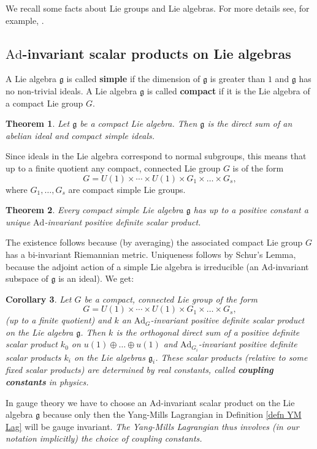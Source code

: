 \documentclass[12pt]{amsart}
\newtheorem{thm}{Theorem}[section]
\newtheorem{cor}[thm]{Corollary}
\theoremstyle{definition}
\theoremstyle{remark}
\numberwithin{equation}{section}
\begin{document}
We recall some facts about Lie groups and Lie algebras. For more details see, for example, \cite{Ziller}.

\subsection{$\mathrm{Ad}$-invariant scalar products on Lie algebras}

A Lie algebra $\mathfrak{g}$ is called {\bf simple} if the dimension of $\mathfrak{g}$ is greater than $1$ and $\mathfrak{g}$ has no non-trivial ideals. A Lie algebra $\mathfrak{g}$ is called {\bf compact} if it is the Lie algebra of a compact Lie group $G$.

\begin{thm} Let $\mathfrak{g}$ be a compact Lie algebra. Then $\mathfrak{g}$ is the direct sum of an abelian ideal and compact simple ideals.
\end{thm}
Since ideals in the Lie algebra correspond to normal subgroups, this means that up to a finite quotient any compact, connected Lie group $G$ is of the form
\begin{equation*}
G=U(1)\times\cdots\times U(1)\times G_1\times\ldots\times G_s,
\end{equation*}
where $G_1,\ldots,G_s$ are compact simple Lie groups.
\begin{thm} Every compact simple Lie algebra $\mathfrak{g}$ has up to a positive constant a unique $\mathrm{Ad}$-invariant positive definite scalar product. 
\end{thm}
The existence follows because (by averaging) the associated compact Lie group $G$ has a bi-invariant Riemannian metric. Uniqueness follows by Schur's Lemma, because the adjoint action of a simple Lie algebra is irreducible (an $\mathrm{Ad}$-invariant subspace of $\mathfrak{g}$ is an ideal). We get:
\begin{cor}
Let $G$ be a compact, connected Lie group of the form
\begin{equation*}
G=U(1)\times\cdots\times U(1)\times G_1\times\ldots\times G_s,
\end{equation*}
(up to a finite quotient) and $k$ an $\mathrm{Ad}_G$-invariant positive definite scalar product on the Lie algebra $\mathfrak{g}$. Then $k$ is the orthogonal direct sum of a positive definite scalar product $k_0$ on $u(1)\oplus\ldots\oplus u(1)$ and $\mathrm{Ad}_{G_i}$-invariant positive definite scalar products $k_i$ on the Lie algebras $\mathfrak{g}_i$. These scalar products (relative to some fixed scalar products) are determined by real constants, called {\bf coupling constants} in physics.
\end{cor}
In gauge theory we have to choose an $\mathrm{Ad}$-invariant scalar product on the Lie algebra $\mathfrak{g}$ because only then the Yang-Mills Lagrangian in Definition \ref{defn YM Lag} will be gauge invariant. {\em The Yang-Mills Lagrangian thus involves (in our notation implicitly) the choice of coupling constants.}
\end{document}
